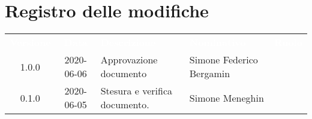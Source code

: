 \section*{Registro delle modifiche}
{
	\centering
	\begin{longtable}{ c c C{4cm}  C{4cm}  C{3cm} }
		\textcolor{white}{\textbf{Versione}} & \textcolor{white}{\textbf{Data}} & \textcolor{white}{\textbf{Descrizione}} & \textcolor{white}{\textbf{Nominativo}} & \textcolor{white}{\textbf{Ruolo}}\\		
		1.0.0 & 2020-06-06 & Approvazione documento & Simone Federico Bergamin &\RdP{}\\	
		0.1.0 & 2020-06-05 & Stesura e verifica documento. & Simone Meneghin &\reda{}\\		
		
	\end{longtable}

}
